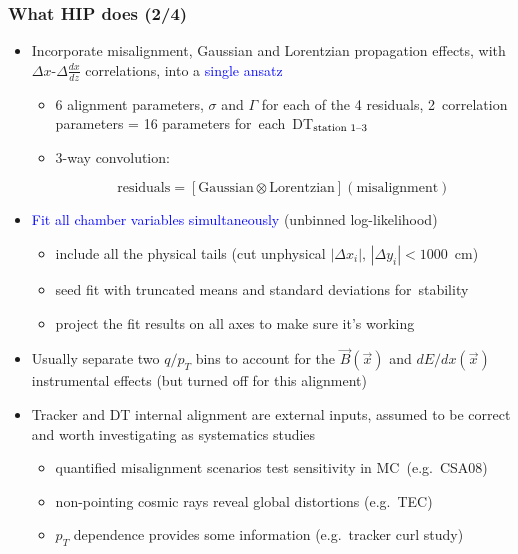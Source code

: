 \documentclass[compress]{beamer}
\begin{document}
\begin{frame}
\frametitle{What HIP does (2/4)}

\begin{itemize}\setlength{\itemsep}{0.1 cm}
\item Incorporate misalignment, Gaussian and Lorentzian propagation
  effects, with $\Delta x$-$\Delta \frac{dx}{dz}$ correlations, into a \textcolor{blue}{single ansatz}
\begin{itemize}
\item 6 alignment parameters, $\sigma$ and $\Gamma$ for each of the 4 residuals, 2~correlation parameters = 16 parameters \mbox{for each DT$_{\mbox{\scriptsize station 1--3}}$\hspace{-1 cm}}
\item 3-way convolution: 

\vspace{-0.35 cm}
\[ \mbox{residuals} = [\mbox{Gaussian} \otimes \mbox{Lorentzian}](\mbox{misalignment}) \]
\end{itemize}

\item \textcolor{blue}{Fit all chamber variables simultaneously} {\scriptsize (unbinned log-likelihood)}
\begin{itemize}
\item include all the physical tails {\scriptsize (cut unphysical $|\Delta x_i|\mbox{, }|\Delta y_i| < 1000$~cm)}
\item seed fit with truncated means and standard deviations \mbox{for stability\hspace{-1 cm}}
\item project the fit results on all axes to make sure it's working
\end{itemize}

\item Usually separate two $q/p_T$ bins to account for the $\vec{B}(\vec{x})$ and $dE/dx(\vec{x})$ instrumental effects {\scriptsize (but turned off for this alignment)}

\item Tracker and DT internal alignment are external inputs, assumed to be correct and worth investigating as systematics studies
\begin{itemize}
\item quantified misalignment scenarios test sensitivity in \mbox{MC \scriptsize (e.g.\ CSA08)\hspace{-1 cm}}
\item non-pointing cosmic rays reveal global distortions {\scriptsize (e.g.~TEC)}
\item $p_T$ dependence provides some information {\scriptsize (e.g.~tracker curl study)}
\end{itemize}
\end{itemize}
\end{frame}
\end{document}

